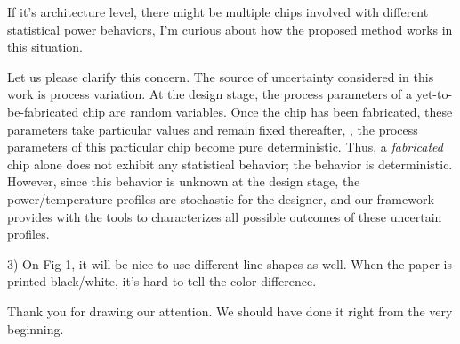 \begin{reviewer}
If it’s architecture level, there might be multiple chips involved with different statistical power behaviors, I’m curious about how the proposed method works in this situation.
\end{reviewer}
\begin{authors}
Let us please clarify this concern.
The source of uncertainty considered in this work is process variation.
At the design stage, the process parameters of a yet-to-be-fabricated chip are random variables.
Once the chip has been fabricated, these parameters take particular values and remain fixed thereafter, \ie, the process parameters of this particular chip become pure deterministic.
Thus, a \emph{fabricated} chip alone does not exhibit any statistical behavior; the behavior is deterministic.
However, since this behavior is unknown at the design stage, the power/temperature profiles are stochastic for the designer, and our framework provides with the tools to characterizes all possible outcomes of these uncertain profiles.

\end{authors}

\begin{reviewer}
3) On Fig 1, it will be nice to use different line shapes as well. When the paper is printed black/white, it’s hard to tell the color difference.
\end{reviewer}
\begin{authors}
Thank you for drawing our attention.
We should have done it right from the very beginning.


\end{authors}
